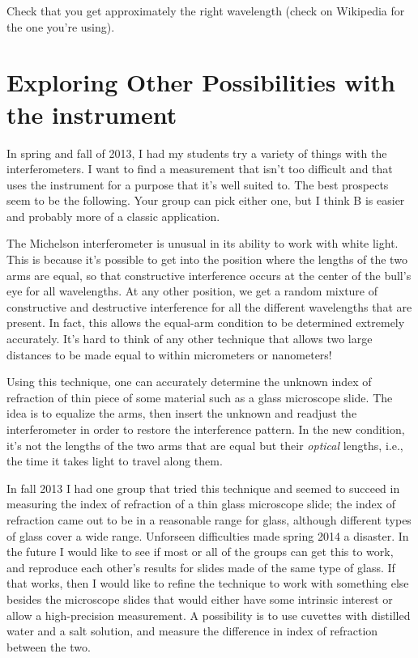 Check that you get approximately the right wavelength (check on Wikipedia for the
one you're using).

\section*{Exploring Other Possibilities with the instrument}

In spring and fall of 2013, I had my students try a variety of things with the interferometers.
I want to find a measurement that isn't too difficult and that uses the instrument for a
purpose that it's well suited to. The best prospects seem to be the following.
Your group can pick either one, but I think B is easier and probably more of
a classic application.


The Michelson interferometer is unusual in its ability to work with white light.
This is because it's possible to get into the position where the lengths of the
two arms are equal, so that constructive interference occurs at the center of
the bull's eye for all wavelengths. At any other position, we get
a random mixture of constructive and destructive interference for all the different
wavelengths that are present. In fact, this allows the equal-arm condition
to be determined extremely accurately. It's hard to think of any other technique
that allows two large distances to be made equal to within micrometers or nanometers!

Using this technique, one can accurately determine the unknown index of refraction of 
thin piece of some material such as a glass microscope slide. The idea is to equalize
the arms, then insert the unknown and readjust the interferometer in order to
restore the interference pattern. In the new condition, it's not the lengths of the
two arms that are equal but their \emph{optical} lengths, i.e., the time it takes
light to travel along them.

In fall 2013 I had one group that tried this technique and
seemed to succeed in measuring the index of refraction of a thin glass microscope slide;
the index of refraction came out to be in a reasonable range for glass, although different
types of glass cover a wide range. Unforseen difficulties made spring 2014 a disaster.
In the future I would like to see if most or all
of the groups can get this to work, and reproduce each other's results for slides made
of the same type of glass. If that works, then I would like to refine the technique to
work with something else besides the microscope slides that would either have some
intrinsic interest or allow a high-precision measurement. A possibility is to use
cuvettes with distilled water and a salt solution, and measure the difference in
index of refraction between the two.


